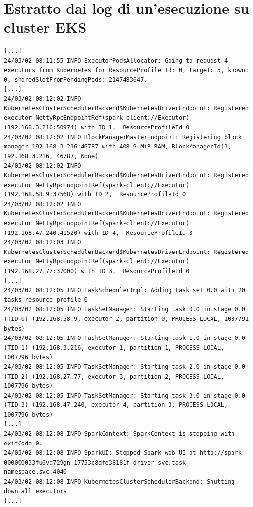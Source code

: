 \documentclass[12pt,a4paper,fleqn,titlepage]{report}
\begin{document}
\chapter{Estratto dai log di un'esecuzione su cluster EKS}\label{apx:logs}
\begin{lstlisting}
[...]
24/03/02 08:11:55 INFO ExecutorPodsAllocator: Going to request 4 executors from Kubernetes for ResourceProfile Id: 0, target: 5, known: 0, sharedSlotFromPendingPods: 2147483647.
[...]
24/03/02 08:12:02 INFO KubernetesClusterSchedulerBackend$KubernetesDriverEndpoint: Registered executor NettyRpcEndpointRef(spark-client://Executor) (192.168.3.216:50974) with ID 1,  ResourceProfileId 0
24/03/02 08:12:02 INFO BlockManagerMasterEndpoint: Registering block manager 192.168.3.216:46787 with 408.9 MiB RAM, BlockManagerId(1, 192.168.3.216, 46787, None)
24/03/02 08:12:02 INFO KubernetesClusterSchedulerBackend$KubernetesDriverEndpoint: Registered executor NettyRpcEndpointRef(spark-client://Executor) (192.168.58.9:37568) with ID 2,  ResourceProfileId 0
24/03/02 08:12:02 INFO KubernetesClusterSchedulerBackend$KubernetesDriverEndpoint: Registered executor NettyRpcEndpointRef(spark-client://Executor) (192.168.47.240:41520) with ID 4,  ResourceProfileId 0
24/03/02 08:12:03 INFO KubernetesClusterSchedulerBackend$KubernetesDriverEndpoint: Registered executor NettyRpcEndpointRef(spark-client://Executor) (192.168.27.77:37000) with ID 3,  ResourceProfileId 0
[...]
24/03/02 08:12:05 INFO TaskSchedulerImpl: Adding task set 0.0 with 20 tasks resource profile 0
24/03/02 08:12:05 INFO TaskSetManager: Starting task 0.0 in stage 0.0 (TID 0) (192.168.58.9, executor 2, partition 0, PROCESS_LOCAL, 1007791 bytes)
24/03/02 08:12:05 INFO TaskSetManager: Starting task 1.0 in stage 0.0 (TID 1) (192.168.3.216, executor 1, partition 1, PROCESS_LOCAL, 1007796 bytes)
24/03/02 08:12:05 INFO TaskSetManager: Starting task 2.0 in stage 0.0 (TID 2) (192.168.27.77, executor 3, partition 2, PROCESS_LOCAL, 1007796 bytes)
24/03/02 08:12:05 INFO TaskSetManager: Starting task 3.0 in stage 0.0 (TID 3) (192.168.47.240, executor 4, partition 3, PROCESS_LOCAL, 1007796 bytes)
[...]
24/03/02 08:12:08 INFO SparkContext: SparkContext is stopping with exitCode 0.
24/03/02 08:12:08 INFO SparkUI: Stopped Spark web UI at http://spark-000000033fu6vq729gn-17753c8dfe38181f-driver-svc.task-namespace.svc:4040
24/03/02 08:12:08 INFO KubernetesClusterSchedulerBackend: Shutting down all executors
[...]
\end{lstlisting}
\end{document}
